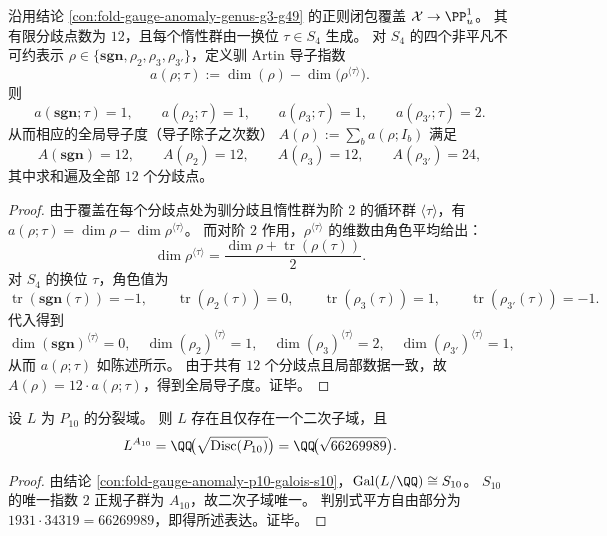 \begin{theorem}\label{thm:fold-gauge-anomaly-s4-regular-closure-tame-artin-conductor-degrees}
沿用结论 \ref{con:fold-gauge-anomaly-genus-g3-g49} 的正则闭包覆盖
\(\mathcal X\to\PP^1_u\)。
其有限分歧点数为 \(12\)，且每个惰性群由一换位 \(\tau\in S_4\) 生成。
对 \(S_4\) 的四个非平凡不可约表示 \(\rho\in\{\mathbf{sgn},\rho_2,\rho_3,\rho_{3'}\}\)，定义驯 Artin 导子指数
\[
a(\rho;\tau):=\dim(\rho)-\dim\bigl(\rho^{\langle\tau\rangle}\bigr).
\]
则
\[
a(\mathbf{sgn};\tau)=1,\qquad
a(\rho_{2};\tau)=1,\qquad
a(\rho_{3};\tau)=1,\qquad
a(\rho_{3'};\tau)=2.
\]
从而相应的全局导子度（导子除子之次数）
\(
A(\rho):=\sum_{b}a(\rho;I_b)
\)
满足
\[
A(\mathbf{sgn})=12,\qquad
A(\rho_{2})=12,\qquad
A(\rho_{3})=12,\qquad
A(\rho_{3'})=24,
\]
其中求和遍及全部 \(12\) 个分歧点。
\end{theorem}
\begin{proof}
由于覆盖在每个分歧点处为驯分歧且惰性群为阶 \(2\) 的循环群 \(\langle\tau\rangle\)，有
\(
a(\rho;\tau)=\dim\rho-\dim\rho^{\langle\tau\rangle}
\)。
而对阶 \(2\) 作用，\(\rho^{\langle\tau\rangle}\) 的维数由角色平均给出：
\[
\dim\rho^{\langle\tau\rangle}=\frac{\dim\rho+\operatorname{tr}(\rho(\tau))}{2}.
\]
对 \(S_4\) 的换位 \(\tau\)，角色值为
\[
\operatorname{tr}(\mathbf{sgn}(\tau))=-1,\qquad
\operatorname{tr}(\rho_2(\tau))=0,\qquad
\operatorname{tr}(\rho_3(\tau))=1,\qquad
\operatorname{tr}(\rho_{3'}(\tau))=-1.
\]
代入得到
\[
\dim(\mathbf{sgn})^{\langle\tau\rangle}=0,\quad
\dim(\rho_2)^{\langle\tau\rangle}=1,\quad
\dim(\rho_3)^{\langle\tau\rangle}=2,\quad
\dim(\rho_{3'})^{\langle\tau\rangle}=1,
\]
从而 \(a(\rho;\tau)\) 如陈述所示。
由于共有 \(12\) 个分歧点且局部数据一致，故 \(A(\rho)=12\cdot a(\rho;\tau)\)，得到全局导子度。证毕。
\end{proof}

\begin{corollary}[分裂域的唯一二次子域]\label{cor:fold-gauge-anomaly-p10-unique-quadratic-subfield}
设 \(L\) 为 \(P_{10}\) 的分裂域。
则 \(L\) 存在且仅存在一个二次子域，且
\[
L^{A_{10}}=\QQ\!\bigl(\sqrt{\mathrm{Disc}(P_{10})}\bigr)=\QQ\!\bigl(\sqrt{66269989}\bigr).
\]
\end{corollary}
\begin{proof}
由结论 \ref{con:fold-gauge-anomaly-p10-galois-s10}，\(\mathrm{Gal}(L/\QQ)\cong S_{10}\)。
\(S_{10}\) 的唯一指数 \(2\) 正规子群为 \(A_{10}\)，故二次子域唯一。
判别式平方自由部分为 \(1931\cdot 34319=66269989\)，即得所述表达。证毕。
\end{proof}

